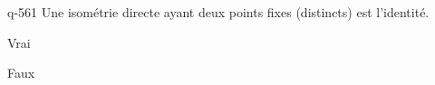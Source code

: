 \begin{truefalse}{q-561}
Une isométrie directe ayant deux points fixes (distincts) est l'identité.
\item* Vrai
\item Faux
\end{truefalse}

